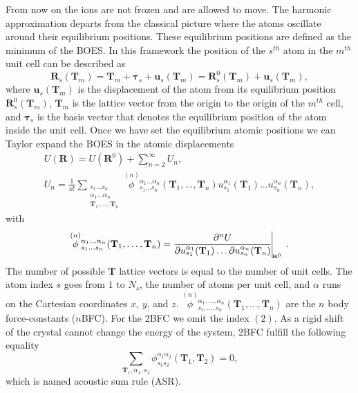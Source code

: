 From now on the ions are not frozen and are allowed to move. The harmonic approximation departs from the classical picture where the atoms oscillate around their equilibrium positions. These equilibrium positions are defined as 
the minimum of the BOES. In this framework the position of the $s^{th}$ atom in the $m^{th}$ unit cell can be described as
\begin{equation}
 \mathbf{R}_{s}(\mathbf{T}_{m})=\mathbf{T}_{m}+\boldsymbol{\tau}_{s}+\mathbf{u}_{s}(\mathbf{T}_{m})=\mathbf{R}_{s}^{0}(\mathbf{T}_{m})+\mathbf{u}_{s}(\mathbf{T}_{m}),
\end{equation}  
where $\mathbf{u}_{s}(\mathbf{T}_{m})$ is the displacement of the atom from its equilibrium position $\mathbf{R}_{s}^{0}(\mathbf{T}_{m})$, $\mathbf{T}_{m}$ is the lattice vector from the origin to the origin of the $m^{th}$ 
cell, and $\boldsymbol{\tau}_{s}$ is the basis vector that denotes the equilibrium position of the atom inside the unit cell. Once we have set the equilibrium atomic positions we can Taylor expand the BOES in the atomic displacements
\begin{multline}
 \label{taylor-expansion}
 U(\mathbf{R})=U(\mathbf{R}^{0})+\sum_{n=2}^{\infty}U_{n}, \\ U_{n}=\frac{1}{n!}\sum\limits_{\substack{s_{1}\dots s_{n} \\ \alpha_{1}\dots\alpha_{n} \\ \mathbf{T}_{1},\dots,\mathbf{T}_{n}}} 
 \overset{(n)}{\phi}{}_{s_{1}\dots s_{n}}^{\alpha_{1}\dots\alpha_{n}}(\mathbf{T}_{1},\dots,\mathbf{T}_{n})u_{s_{1}}^{\alpha_{1}}(\mathbf{T}_{1})\dots u_{s_{n}}^{\alpha_{n}}(\mathbf{T}_{n}),
\end{multline}
with
\begin{equation}
 \label{perturbative-nbfc}
 \overset{(n)}{\phi}{}_{s_{1}\dots s_{n}}^{\alpha_{1}\dots\alpha_{n}}(\mathbf{T}_{1},\dots,\mathbf{T}_{n})=\frac{\partial^{n}U}{\partial u_{s_{1}}^{\alpha_{1}}(\mathbf{T}_{1})\dots\partial u_{s_{n}}^{
 \alpha_{n}}(\mathbf{T}_{n})}\vline_{_{_{_{_{_{_{_{_{\mathbf{R}^{0}}}}}}}}}}.
\end{equation}
The number of possible $\mathbf{T}$ lattice vectors is equal to the number of unit cells. The atom index $s$ goes from $1$ to $N_{s}$, the number of atoms per unit cell, and $\alpha$ runs on the Cartesian coordinates $x$, $y$, and 
$z$. $\overset{(n)}{\phi}{}_{s_{1},\dots,s_{n}}^{\alpha_{1},\dots,\alpha_{n}}(\mathbf{T}_{1},\dots,\mathbf{T}_{n})$ 
are the $n$ body force-constants ($n$BFC). For the 2BFC we omit the index $(2)$. As a rigid shift of the crystal 
cannot change the energy of the system, 2BFC fulfill the following equality
\begin{equation}
\label{acoustic-sum-rule}
\sum_{\mathbf{T}_{1},\alpha_{1},s_{1}}\phi_{s_{1}s_{2}}^{\alpha_{1}\alpha_{2}}(\mathbf{T}_{1},\mathbf{T}_{2})=0,
\end{equation}
which is named acoustic sum rule (ASR). \\

